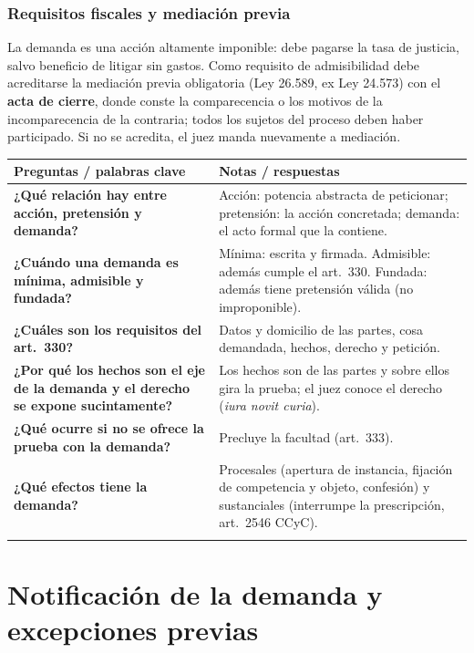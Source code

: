 \documentclass[12pt,oneside]{book}
\newenvironment{cornell}[1]{%
  \par\medskip\noindent{\small\bfseries Cuadro Cornell: #1}\par\smallskip
  \begin{longtable}{|>{\RaggedRight\arraybackslash}p{0.27\textwidth}|>{\RaggedRight\arraybackslash}p{0.66\textwidth}|}
  \hline
  \textbf{\small Preguntas / palabras clave} & \textbf{\small Notas / respuestas} \\ \hline\endhead
}{\end{longtable}\par\medskip}
\newcommand{\cqa}[2]{\textbf{#1} & #2 \\ \hline}
\newcommand{\cornellsummary}[1]{\multicolumn{2}{|p{0.95\textwidth}|}{\textbf{Resumen:} #1} \\ \hline}
\begin{document}
\subsection{Requisitos fiscales y mediación previa}

La demanda es una acción altamente imponible: debe pagarse la tasa de justicia, salvo beneficio de litigar sin gastos. %
Como requisito de admisibilidad debe acreditarse la mediación previa obligatoria (Ley 26.589, ex Ley 24.573) con el \textbf{acta de cierre}, donde conste la comparecencia o los motivos de la incomparecencia de la contraria; todos los sujetos del proceso deben haber participado. Si no se acredita, el juez manda nuevamente a mediación. %

\begin{cornell}{la demanda}
\cqa{¿Qué relación hay entre acción, pretensión y demanda?}{Acción: potencia abstracta de peticionar; pretensión: la acción concretada; demanda: el acto formal que la contiene.}
\cqa{¿Cuándo una demanda es mínima, admisible y fundada?}{Mínima: escrita y firmada. Admisible: además cumple el art.~330. Fundada: además tiene pretensión válida (no improponible).}
\cqa{¿Cuáles son los requisitos del art.~330?}{Datos y domicilio de las partes, cosa demandada, hechos, derecho y petición.}
\cqa{¿Por qué los hechos son el eje de la demanda y el derecho se expone sucintamente?}{Los hechos son de las partes y sobre ellos gira la prueba; el juez conoce el derecho (\textit{iura novit curia}).}
\cqa{¿Qué ocurre si no se ofrece la prueba con la demanda?}{Precluye la facultad (art.~333).}
\cqa{¿Qué efectos tiene la demanda?}{Procesales (apertura de instancia, fijación de competencia y objeto, confesión) y sustanciales (interrumpe la prescripción, art.~2546 CCyC).}
\cornellsummary{La demanda contiene la pretensión, abre la instancia y debe cumplir el art.~330 con prueba documental y ofrecimiento de los demás medios. Produce efectos procesales (fija competencia y objeto litigioso) y sustanciales (interrumpe la prescripción), y exige mediación previa y tasa de justicia.}
\end{cornell}
\chapter{Notificación de la demanda y excepciones previas}
\label{cap:notificacion}
\end{document}

